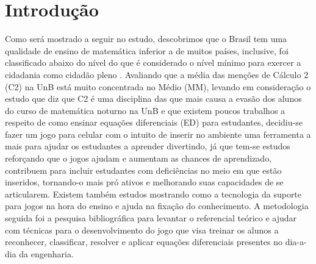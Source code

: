 \chapter[Introdução]{Introdução}

\begin{comment}
Tendo em vista que já é difícil para alunos aprenderem matemática, a dificuldade só aumenta quando fala-se de alunos com Transtorno do Déficit de Atenção com Hiperatividade (TDAH) inseridos no contexto de faculdade, onde a desatenção aumenta, já que professores não estão preparados e precisam renovar seus métodos para atrair atenção dos alunos para ensinar a matéria e ainda fazer disso algo divertido para fazer com que o foco seja maior ainda. Já que aprender brincando gera melhores resultados. Segundo (Russel A. Barkley, PhD. p. iv) quem possui TDAH têm mais dificuldades que pessoas normais em ambientes que exijam mais foco, objetividade e autocontrole. Também é dito que as características principais de TDAH podem trazer diversas dificuldades no contexto escolar (George J. DuPaul, PhD e Gary Stoner, PhD. p.4).

De acordo com (George J. DuPaul, PhD e Gary Stoner, PhD. p.4) o TDAH comparado a outros problemas como autismo e depressão é um transtorno de alta incidência e se mostra presente principalmente em meninos. Por isso o foco deste estudo também será em estudantes com TDAH.
\end{comment}

Como será mostrado a seguir no estudo, descobrimos que o Brasil tem uma qualidade de ensino de matemática inferior a de muitos países, inclusive, foi classificado abaixo do nível do que é considerado o nível mínimo para exercer a cidadania como cidadão pleno \cite{inep2015nivelcidadania}. Avaliando que a média das menções de Cálculo 2 (C2) na UnB está muito concentrada no Médio (MM), levando em consideração o estudo \cite{evasaoC2} que diz que C2 é uma disciplina das que mais causa a evasão dos alunos do curso de matemática noturno na UnB e que existem poucos trabalhos a respeito de como ensinar equações diferenciais (ED) para estudantes, decidiu-se fazer um jogo para celular com o intuito de inserir no ambiente uma ferramenta a mais para ajudar os estudantes a aprender divertindo, já que tem-se estudos reforçando que o jogos ajudam e aumentam as chances de aprendizado, contribuem para incluir estudantes com deficiências no meio em que estão inseridos, tornando-o mais pró ativos e melhorando suas capacidades de se articularem. Existem também estudos mostrando como a tecnologia da suporte para jogos na hora do ensino e ajuda na fixação do conhecimento. A metodologia seguida foi a pesquisa bibliográfica para levantar o referencial teórico e ajudar com técnicas para o desenvolvimento do jogo que visa treinar os alunos a reconhecer, classificar, resolver e aplicar equações diferenciais presentes no dia-a-dia da engenharia.


